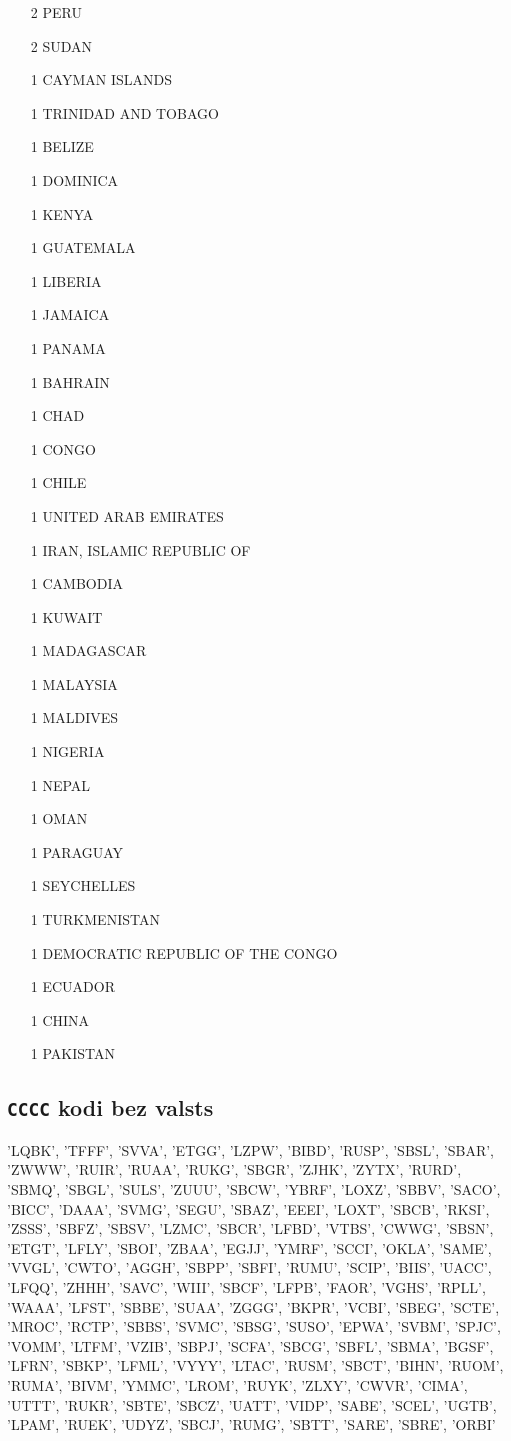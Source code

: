 \documentclass[12pt,a4paper]{article}
\begin{document}
\begin{multicols*}{3}
\begin{itemize}
\item[2] PERU
\item[2] SUDAN
\item[1] CAYMAN ISLANDS
\item[1] TRINIDAD AND TOBAGO
\item[1] BELIZE
\item[1] DOMINICA
\item[1] KENYA
\item[1] GUATEMALA
\item[1] LIBERIA
\item[1] JAMAICA
\item[1] PANAMA
\item[1] BAHRAIN
\item[1] CHAD
\item[1] CONGO
\item[1] CHILE
\item[1] UNITED ARAB EMIRATES
\item[1] IRAN, ISLAMIC REPUBLIC OF
\item[1] CAMBODIA
\item[1] KUWAIT
\item[1] MADAGASCAR
\item[1] MALAYSIA
\item[1] MALDIVES
\item[1] NIGERIA
\item[1] NEPAL
\item[1] OMAN
\item[1] PARAGUAY
\item[1] SEYCHELLES
\item[1] TURKMENISTAN
\item[1] DEMOCRATIC REPUBLIC OF THE CONGO
\item[1] ECUADOR
\item[1] CHINA
\item[1] PAKISTAN
    \end{itemize}
\end{multicols*}

\subsection*{\texttt{CCCC} kodi bez valsts}
'LQBK', 'TFFF', 'SVVA', 'ETGG', 'LZPW', 'BIBD', 'RUSP', 'SBSL', 'SBAR', 'ZWWW', 'RUIR', 'RUAA', 'RUKG', 'SBGR', 'ZJHK', 'ZYTX', 'RURD', 'SBMQ', 'SBGL', 'SULS', 'ZUUU', 'SBCW', 'YBRF', 'LOXZ', 'SBBV', 'SACO', 'BICC', 'DAAA', 'SVMG', 'SEGU', 'SBAZ', 'EEEI', 'LOXT', 'SBCB', 'RKSI', 'ZSSS', 'SBFZ', 'SBSV', 'LZMC', 'SBCR', 'LFBD', 'VTBS', 'CWWG', 'SBSN', 'ETGT', 'LFLY', 'SBOI', 'ZBAA', 'EGJJ', 'YMRF', 'SCCI', 'OKLA', 'SAME', 'VVGL', 'CWTO', 'AGGH', 'SBPP', 'SBFI', 'RUMU', 'SCIP', 'BIIS', 'UACC', 'LFQQ', 'ZHHH', 'SAVC', 'WIII', 'SBCF', 'LFPB', 'FAOR', 'VGHS', 'RPLL', 'WAAA', 'LFST', 'SBBE', 'SUAA', 'ZGGG', 'BKPR', 'VCBI', 'SBEG', 'SCTE', 'MROC', 'RCTP', 'SBBS', 'SVMC', 'SBSG', 'SUSO', 'EPWA', 'SVBM', 'SPJC', 'VOMM', 'LTFM', 'VZIB', 'SBPJ', 'SCFA', 'SBCG', 'SBFL', 'SBMA', 'BGSF', 'LFRN', 'SBKP', 'LFML', 'VYYY', 'LTAC', 'RUSM', 'SBCT', 'BIHN', 'RUOM', 'RUMA', 'BIVM', 'YMMC', 'LROM', 'RUYK', 'ZLXY', 'CWVR', 'CIMA', 'UTTT', 'RUKR', 'SBTE', 'SBCZ', 'UATT', 'VIDP', 'SABE', 'SCEL', 'UGTB', 'LPAM', 'RUEK', 'UDYZ', 'SBCJ', 'RUMG', 'SBTT', 'SARE', 'SBRE', 'ORBI'
\end{document}
